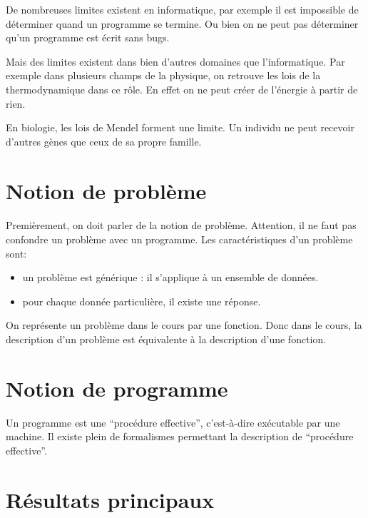 De nombreuses limites existent en informatique, par exemple il est impossible de déterminer quand un programme se termine. Ou bien on ne peut pas déterminer qu'un programme est écrit sans bugs.

Mais des limites existent dans bien d'autres domaines que l'informatique. 
Par exemple dans plusieurs champs de la physique, on retrouve les lois de la 
thermodynamique dans ce rôle. En effet on ne peut créer de l'énergie à partir de rien.

En biologie, les lois de Mendel forment une limite. Un individu ne peut recevoir 
d'autres gènes que ceux de sa propre famille. %

\section{Notion de problème}
\label{sec:notion_de_probl_me}

\paragraph{}
Premièrement, on doit parler de la notion de problème.
Attention, il ne faut pas confondre un problème avec un programme.
Les caractéristiques d'un problème sont:

\begin{itemize}
	\item un problème est générique : il s'applique à un ensemble de données.
	\item pour chaque donnée particulière, il existe une réponse.
\end{itemize}
On représente un problème dans le cours par une fonction. Donc dans le cours,
la description d'un problème est équivalente à la description d'une fonction.

\section{Notion de programme}
\label{sec:notion_de_programme}

Un programme est une ``procédure effective'', c'est-à-dire exécutable par une machine.
Il existe plein de formalismes permettant la description de ``procédure effective''.


\section{Résultats principaux}
\label{sec:r_sultat_principaux}


